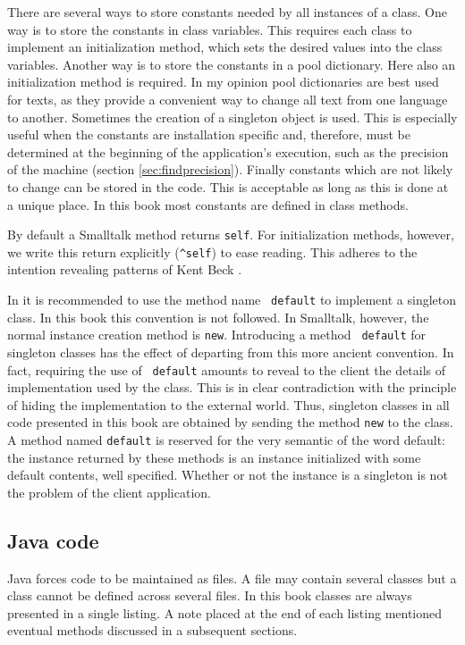 \documentclass[twoside]{book}
\begin{document}
There are several ways to store constants needed by all instances
of a class. One way is to store the constants in class variables.
This requires each class to implement an initialization method,
which sets the desired values into the class variables. Another
way is to store the constants in a pool dictionary. Here also an
initialization method is required. In my opinion pool dictionaries
are best used for texts, as they provide a convenient way to
change all text from one language to another. Sometimes the
creation of a singleton object is used. This is especially useful
when the constants are installation specific and, therefore, must
be determined at the beginning of the application's execution,
such as the precision of the machine (\cf section
\ref{sec:findprecision}). Finally constants which are not likely
to change can be stored in the code. This is acceptable as long as
this is done at a unique place. In this book most constants are
defined in class methods.

By default a Smalltalk method returns {\tt self}. For
initialization methods, however, we write this return explicitly
({\tt \^\/self}) to ease reading. This adheres to the intention
revealing patterns of Kent Beck \cite{Beck}.

In \cite{StDesPat} it is recommended to use the method name {\tt
default} to implement a singleton class. In this book this
convention is not followed. In Smalltalk, however, the normal
instance creation method is {\tt new}. Introducing a method {\tt
default} for singleton classes has the effect of departing from
this more ancient convention. In fact, requiring the use of {\tt
default} amounts to reveal to the client the details of
implementation used by the class. This is in clear contradiction
with the principle of hiding the implementation to the external
world. Thus, singleton classes in all code presented in this book
are obtained by sending the method {\tt new} to the class. A
method named {\tt default} is reserved for the very semantic of
the word default: the instance returned by these methods is an
instance initialized with some default contents, well specified.
Whether or not the instance is a singleton is not the problem of
the client application.

\subsection{Java code}
Java forces code to be maintained as files. A file may contain
several classes but a class cannot be defined across several
files. In this book classes are always presented in a single
listing. A note placed at the end of each listing mentioned
eventual methods discussed in a subsequent sections.
\end{document}
